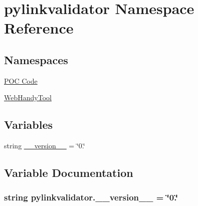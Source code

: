\hypertarget{namespacepylinkvalidator}{}\section{pylinkvalidator Namespace Reference}
\label{namespacepylinkvalidator}
\subsection*{Namespaces}
\begin{DoxyCompactItemize}
\item 
 \hyperlink{namespacepylinkvalidator_1_1_p_o_c_01_code}{P\+O\+C Code}
\item 
 \hyperlink{namespacepylinkvalidator_1_1_web_handy_tool}{Web\+Handy\+Tool}
\end{DoxyCompactItemize}
\subsection*{Variables}
\begin{DoxyCompactItemize}
\item 
string \hyperlink{namespacepylinkvalidator_ab682598dd4cb452742afdbe0bf646cda}{\+\_\+\+\_\+version\+\_\+\+\_\+} = \char`\"{}0.\char`\"{}
\end{DoxyCompactItemize}


\subsection{Variable Documentation}
\subsubsection[{\+\_\+\+\_\+version\+\_\+\+\_\+}]{\setlength{\rightskip}{0pt plus 5cm}string pylinkvalidator.\+\_\+\+\_\+version\+\_\+\+\_\+ = \char`\"{}0.\char`\"{}}\hypertarget{namespacepylinkvalidator_ab682598dd4cb452742afdbe0bf646cda}{}\label{namespacepylinkvalidator_ab682598dd4cb452742afdbe0bf646cda}
